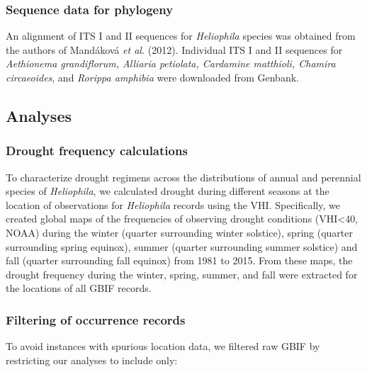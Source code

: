 \documentclass[man,floatsintext]{apa6}
\theoremstyle{definition}
\theoremstyle{definition}
\theoremstyle{definition}
\theoremstyle{remark}
\begin{document}
\hypertarget{sequence-data-for-phylogeny}{%
\subsubsection{Sequence data for
phylogeny}\label{sequence-data-for-phylogeny}}

An alignment of ITS I and II sequences for \emph{Heliophila} species was
obtained from the authors of Mandáková \emph{et al.} (2012). Individual
ITS I and II sequences for \emph{Aethionema grandiflorum, Alliaria
petiolata, Cardamine matthioli, Chamira circaeoides}, and \emph{Rorippa
amphibia} were downloaded from Genbank.

\hypertarget{analyses}{%
\subsection{Analyses}\label{analyses}}

\hypertarget{drought-frequency-calculations}{%
\subsubsection{Drought frequency
calculations}\label{drought-frequency-calculations}}

To characterize drought regimens across the distributions of annual and
perennial species of \emph{Heliophila}, we calculated drought during
different seasons at the location of observations for \emph{Heliophila}
records using the VHI. Specifically, we created global maps of the
frequencies of observing drought conditions (VHI\textless{}40, NOAA)
during the winter (quarter surrounding winter solstice), spring (quarter
surrounding spring equinox), summer (quarter surrounding summer
solstice) and fall (quarter surrounding fall equinox) from 1981 to 2015.
From these maps, the drought frequency during the winter, spring,
summer, and fall were extracted for the locations of all GBIF records.

\hypertarget{filtering-of-occurrence-records}{%
\subsubsection{Filtering of occurrence
records}\label{filtering-of-occurrence-records}}

To avoid instances with spurious location data, we filtered raw GBIF by
restricting our analyses to include only:
\end{document}
